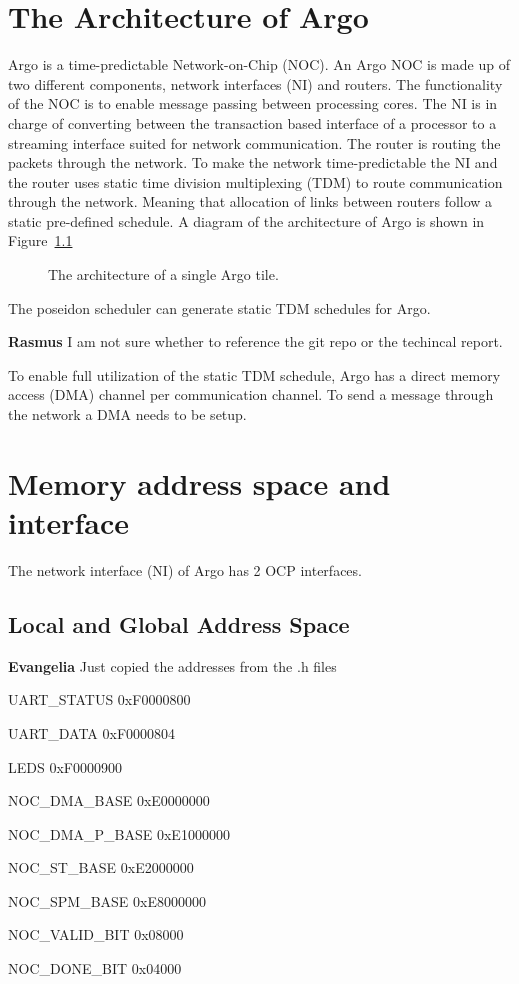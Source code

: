 \documentclass[a4paper,fontsize=10pt,twoside,DIV15,BCOR12mm,headinclude=true,footinclude=false,pagesize,bibtotoc]{scrbook}
\newcommand{\comment}[3]{

\textsf{\textbf{#1}} {\color{#3}#2}}
\newcommand{\rasmus}[1]{\comment{Rasmus}{#1}{Mahogany}}
\newcommand{\eva}[1]{\comment{Evangelia}{#1}{Green}}
\begin{document}
\chapter{The Architecture of Argo}
\label{sec:arch}

Argo is a time-predictable Network-on-Chip (NOC). An Argo NOC is made up of two different components,
network interfaces (NI) and routers.
The functionality of the NOC is to enable message passing between processing cores.
The NI is in charge of converting between the transaction based interface
of a processor to a streaming interface suited for network communication.
The router is routing the packets through the network.
To make the network time-predictable the NI and the router uses static 
time division multiplexing (TDM) to route communication through the network.
Meaning that allocation of links between routers follow a static pre-defined schedule.
A diagram of the architecture of Argo is shown in Figure~\ref{fig:diag}

\begin{figure}
\label{fig:diag}
\centering
\caption{The architecture of a single Argo tile.}
\end{figure}

The poseidon scheduler can generate static TDM schedules for Argo.
\rasmus{I am not sure whether to reference the git repo or the techincal report.}

To enable full utilization of the static TDM schedule,
Argo has a direct memory access (DMA) channel per communication channel.
To send a message through the network a DMA needs to be setup.


\chapter{Memory address space and interface}
The network interface (NI) of Argo has 2 OCP\cite{ocp:spec} interfaces.


\section{Local and Global Address Space}

\eva{Just copied the addresses from the .h files}
\begin{enumeration}
\item UART\_STATUS	0xF0000800
\item UART\_DATA	0xF0000804
\item LEDS   		0xF0000900

\item NOC\_DMA\_BASE	0xE0000000
\item NOC\_DMA\_P\_BASE	0xE1000000
\item NOC\_ST\_BASE	0xE2000000
\item NOC\_SPM\_BASE	0xE8000000
\item NOC\_VALID\_BIT	0x08000
\item NOC\_DONE\_BIT	0x04000
\end{enumeration}
\end{document}
